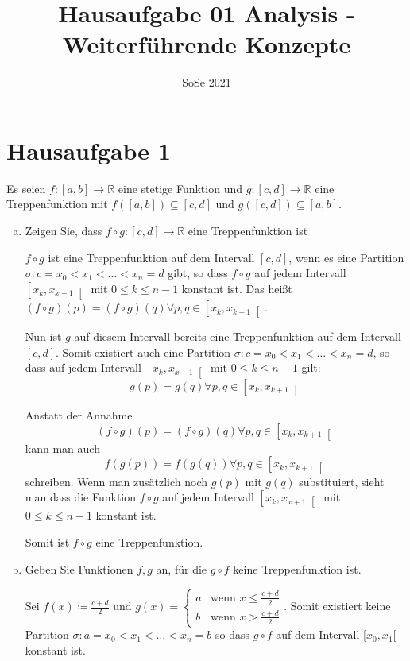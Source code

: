 \documentclass{article}
\author{}
\date{SoSe 2021}
\title{Hausaufgabe 01 Analysis - Weiterführende Konzepte}
\begin{document}
\section*{Hausaufgabe 1}

Es seien $f \colon [a, b] \to \mathbb{R}$ eine stetige Funktion und
$g \colon [c, d] \to \mathbb{R}$ eine Treppenfunktion mit
$f([a, b]) \subseteq [c, d]$ und $g([c, d]) \subseteq [a, b]$.

\begin{enumerate}[a)]
\item Zeigen Sie, dass $f \circ g \colon [c, d] \to \mathbb{R}$ eine
  Treppenfunktion ist

  $f \circ g$ ist eine Treppenfunktion auf dem Intervall $[c, d]$, wenn es
  eine Partition $\sigma \colon c = x_0 < x_1 < \ldots < x_n = d$ gibt, so dass
  $f \circ g$ auf jedem Intervall $\left[x_k, x_{x + 1}\right[$ mit
  $0 \leq k \leq n - 1$ konstant ist.
  Das heißt $(f \circ g)(p) = (f \circ g)(q) \forall p, q \in \left[ x_k, x_{k + 1}\right[$.

  Nun ist $g$ auf diesem Intervall bereits eine Treppenfunktion auf dem
  Intervall $[c, d]$.
  Somit existiert auch eine Partition
  $\sigma \colon c = x_0 < x_1 < \ldots < x_n = d$, so dass auf jedem Intervall
  $\left[x_k, x_{x + 1}\right[$ mit $0 \leq k \leq n - 1$ gilt:
  \[
    g(p) = g(q) \forall p, q \in \left[ x_k, x_{k + 1}\right[
  \]

  Anstatt der Annahme
  \[
    (f \circ g)(p) = (f \circ g)(q) \forall p, q \in \left[ x_k, x_{k + 1}\right[
  \]
  kann man auch
  \[
    f(g(p)) = f(g(q)) \forall p, q \in \left[ x_k, x_{k + 1}\right[
  \]
  schreiben. Wenn man zusätzlich noch $g(p)$ mit $g(q)$ substituiert, sieht man
  dass die Funktion
  $f \circ g$ auf jedem Intervall $\left[x_k, x_{x + 1}\right[$ mit
  $0 \leq k \leq n - 1$ konstant ist.

  Somit ist $f \circ g$ eine Treppenfunktion.
  
\item Geben Sie Funktionen $f, g$ an, für die $g \circ f$ keine
  Treppenfunktion ist.

  Sei $f(x) \coloneqq \frac{c + d}{2}$ und $g(x) = \begin{cases}
    a & \text{wenn $x \leq \frac{c + d}{2}$} \\
    b & \text{wenn $x > \frac{c + d}{2}$}
  \end{cases}$.
  Somit existiert keine Partition
  $\sigma \colon a = x_0 < x_1 < \ldots < x_n = b$
  so dass $g \circ f$ auf dem Intervall $[x_0, x_1[$ konstant ist.
\end{enumerate}
\newpage
\end{document}
